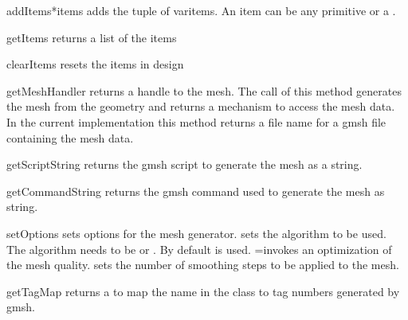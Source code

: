 \begin{methoddesc}[Design]{addItems}{*items}
adds the tuple of var{items}. An item can be any primitive or a .

\end{methoddesc}

\begin{methoddesc}[Design]{getItems}{}
returns a list of the items
\end{methoddesc}

\begin{methoddesc}[Design]{clearItems}{}
resets the items in design
\end{methoddesc}

\begin{methoddesc}[Design]{getMeshHandler}{}
returns a handle to the mesh. The call of this method generates the mesh from the geometry and
returns a mechanism to access the mesh data. In the current implementation this
method returns a file name for a gmsh file containing the mesh data.
\end{methoddesc}

\begin{methoddesc}[Design]{getScriptString}{}
returns the gmsh script to generate the mesh as a string.
\end{methoddesc}

\begin{methoddesc}[Design]{getCommandString}{}
returns the gmsh command used to generate the mesh as string.
\end{methoddesc}

\begin{methoddesc}[Design]{setOptions}{}
sets options for the mesh generator.  sets the algorithm to be used.
The algorithm needs to be 
or . By default  is used. =\True invokes an optimization of the mesh quality.  sets the number of smoothing steps to be applied to the mesh.  
\end{methoddesc}

\begin{methoddesc}[Design]{getTagMap}{}
returns a  to map the name  in the class to tag numbers generated by gmsh.
\end{methoddesc}
